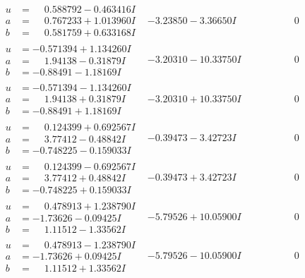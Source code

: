 \documentclass[1p]{elsarticle_modified}
\theoremstyle{definition}
\begin{document}
$$\begin{array}{c|c|c}
\begin{aligned}
u &= \phantom{-}0.588792 - 0.463416 I \\
a &= \phantom{-}0.767233 + 1.013960 I \\
b &= \phantom{-}0.581759 + 0.633168 I\end{aligned}
 & -3.23850 - 3.36650 I & \phantom{-0.000000 } 0 \\ \hline\begin{aligned}
u &= -0.571394 + 1.134260 I \\
a &= \phantom{-}1.94138 - 0.31879 I \\
b &= -0.88491 - 1.18169 I\end{aligned}
 & -3.20310 - 10.33750 I & \phantom{-0.000000 } 0 \\ \hline\begin{aligned}
u &= -0.571394 - 1.134260 I \\
a &= \phantom{-}1.94138 + 0.31879 I \\
b &= -0.88491 + 1.18169 I\end{aligned}
 & -3.20310 + 10.33750 I & \phantom{-0.000000 } 0 \\ \hline\begin{aligned}
u &= \phantom{-}0.124399 + 0.692567 I \\
a &= \phantom{-}3.77412 - 0.48842 I \\
b &= -0.748225 - 0.159033 I\end{aligned}
 & -0.39473 - 3.42723 I & \phantom{-0.000000 } 0 \\ \hline\begin{aligned}
u &= \phantom{-}0.124399 - 0.692567 I \\
a &= \phantom{-}3.77412 + 0.48842 I \\
b &= -0.748225 + 0.159033 I\end{aligned}
 & -0.39473 + 3.42723 I & \phantom{-0.000000 } 0 \\ \hline\begin{aligned}
u &= \phantom{-}0.478913 + 1.238790 I \\
a &= -1.73626 - 0.09425 I \\
b &= \phantom{-}1.11512 - 1.33562 I\end{aligned}
 & -5.79526 + 10.05900 I & \phantom{-0.000000 } 0 \\ \hline\begin{aligned}
u &= \phantom{-}0.478913 - 1.238790 I \\
a &= -1.73626 + 0.09425 I \\
b &= \phantom{-}1.11512 + 1.33562 I\end{aligned}
 & -5.79526 - 10.05900 I & \phantom{-0.000000 } 0 \\ \hline\begin{aligned}

\end{aligned}
\end{array}$$
\end{document}
